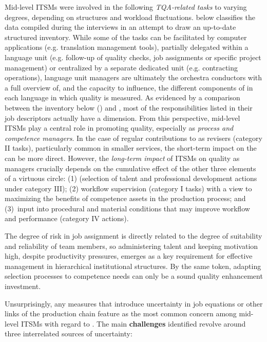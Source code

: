 \documentclass[output=paper]{langsci/langscibook}
\begin{document}
\largerpage

Mid-level ITSMs were involved in the following \textit{TQA-related tasks} to varying degrees, depending on structures and workload fluctuations.  below classifies the data compiled during the interviews in an attempt to draw an up-to-date structured inventory.
While some of the tasks can be facilitated by computer applications (e.g. translation management tools), partially delegated within a language unit (e.g. follow-up of quality checks, job assignments or specific project management) or centralized by a separate dedicated unit (e.g. contracting operations), language unit managers are ultimately the orchestra conductors with a full overview of, and the capacity to influence, the different components of  in each language in which quality is measured. As evidenced by a comparison between the inventory below () and , most of the responsibilities listed in their job descriptors actually have a  dimension. From this perspective, mid-level ITSMs play a central role in promoting quality, especially as \textit{process and competence managers}. In the case of regular contributions to  as revisers (category II tasks), particularly common in smaller services, the short-term impact on the  can be more direct. However, the \textit{long-term impact} of ITSMs on  quality as  managers  crucially depends on the cumulative effect of the other three elements of a virtuous circle: (1)  (selection of talent and professional development actions under category III); (2) workflow supervision (category I tasks) with a view to maximizing the benefits of competence assets in the production process; and (3)~input into procedural and material conditions that may improve workflow and performance (category IV actions).



\newpage 
The degree of risk in job assignment is directly related to the degree of suitability and reliability of team members, so administering talent and keeping motivation high, despite productivity pressures, emerges as a key requirement for effective  management in hierarchical institutional structures. By the same token, adapting selection processes to competence needs can only be a sound quality enhancement investment. 



Unsurprisingly, any measures that introduce uncertainty in job  equations or other links of the production chain feature as the most common concern among mid-level ITSMs with regard to . The main \textbf{challenges} identified revolve around three interrelated sources of uncertainty:
\end{document}
